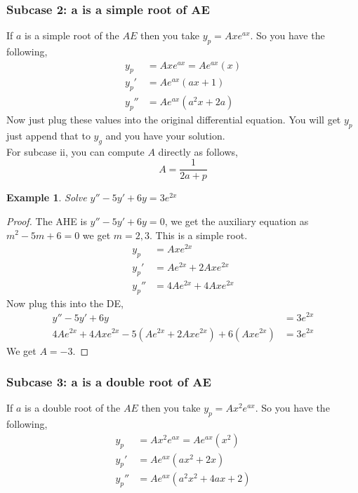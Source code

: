 \documentclass[oneside,11pt,pdftex,final]{book}%
\numberwithin{equation}{section}
\newtheorem{example}[theorem]{Example}
\numberwithin{section}{chapter}
\numberwithin{equation}{chapter}
\begin{document}
\subsubsection{Subcase 2: a is a simple root of AE}
If $ a $ is a simple root of the $ AE $ then you take $ y_p=Axe^{ax} $. So you have the following,
\begin{align*}
	y_p&=Axe^{ax}=Ae^{ax}(x)\\
	y_p'&=Ae^{ax}(ax+1)\\
	y_p''&=Ae^{ax}(a^2x+2a)
\end{align*}
Now just plug these values into the original differential equation. You will get $ y_p $ just append that to $ y_g $ and you have your solution.\\

For subcase ii, you can compute $ A $ directly as follows, \[ A=\frac{1}{2a+p} \]

\begin{example}
	Solve $ y''- 5y'+6y=3e^{2x}$
\end{example}
\begin{proof}
	The AHE is $ y''-5y'+6y=0 $, we get the auxiliary equation as $ m^2-5m+6=0 $ we get $ m=2,3$. This is a simple root.
	 \begin{align*}
		y_p&=Axe^{2x}\\
		y_p'&=Ae^{2x}+2Axe^{2x}\\
		y_p''&=4Ae^{2x}+4Axe^{2x}
	\end{align*}
Now plug this into the DE,
\begin{align*}
	y''- 5y'+6y&=3e^{2x}\\
	4Ae^{2x}+4Axe^{2x}-5(Ae^{2x}+2Axe^{2x})+6(Axe^{2x})&=3e^{2x}
\end{align*}
We get $ A=-3 $.
\end{proof}
\subsubsection{Subcase 3: a is a double root of AE}
If $ a $ is a double root of the $ AE $ then you take $ y_p=Ax^2e^{ax} $. So you have the following,
\begin{align*}
	y_p&=Ax^2e^{ax}=Ae^{ax}(x^2)\\
	y_p'&=Ae^{ax} (ax^2+2x)\\
	y_p''&=Ae^{ax}(a^2x^2+4ax+2)
\end{align*}
\end{document}
